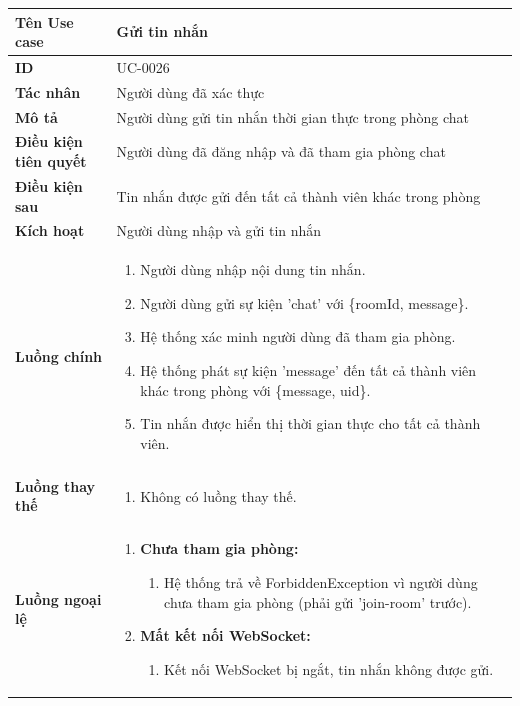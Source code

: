 {
\small
\renewcommand{\arraystretch}{1.15}

\begin{tabularx}{\textwidth}{|>{\raggedright\arraybackslash}p{3.5cm}|>{\raggedright\arraybackslash}X|}
\hline
\textbf{Tên Use case} & Gửi tin nhắn \\
\hline
\textbf{ID} & UC-0026 \\
\hline
\textbf{Tác nhân} & Người dùng đã xác thực \\
\hline
\textbf{Mô tả} & Người dùng gửi tin nhắn thời gian thực trong phòng chat \\
\hline
\textbf{Điều kiện tiên quyết} & Người dùng đã đăng nhập và đã tham gia phòng chat \\
\hline
\textbf{Điều kiện sau} & Tin nhắn được gửi đến tất cả thành viên khác trong phòng \\
\hline
\textbf{Kích hoạt} & Người dùng nhập và gửi tin nhắn \\
\hline
\textbf{Luồng chính} &
\begin{enumerate}
    \item Người dùng nhập nội dung tin nhắn.
    \item Người dùng gửi sự kiện 'chat' với \{roomId, message\}.
    \item Hệ thống xác minh người dùng đã tham gia phòng.
    \item Hệ thống phát sự kiện 'message' đến tất cả thành viên khác trong phòng với \{message, uid\}.
    \item Tin nhắn được hiển thị thời gian thực cho tất cả thành viên.
\end{enumerate} \\
\hline
\textbf{Luồng thay thế} &
\begin{enumerate}
    \item Không có luồng thay thế.
\end{enumerate} \\
\hline
\textbf{Luồng ngoại lệ} &
\begin{enumerate}
    \item \textbf{Chưa tham gia phòng:}
    \begin{enumerate}
        \item[3Err.] Hệ thống trả về ForbiddenException vì người dùng chưa tham gia phòng (phải gửi 'join-room' trước).
    \end{enumerate}
    \item \textbf{Mất kết nối WebSocket:}
    \begin{enumerate}
        \item[2Err.] Kết nối WebSocket bị ngắt, tin nhắn không được gửi.
    \end{enumerate}
\end{enumerate} \\
\hline
\end{tabularx}
}
